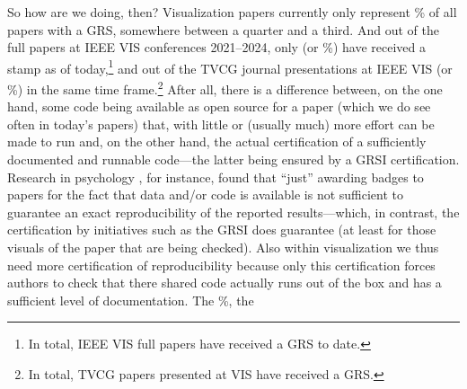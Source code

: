 \documentclass[conference,svgnames]{vgtc}                     %
\newcommand*{\percentageRounded}[2]{%
	\pgfmathparse{#1*100/#2}%
	\pgfmathprintnumber[fixed, precision=1]{\pgfmathresult}%
}
\begin{document}
So how are we doing, then? Visualization papers currently only represent \GrsiPercentageVisPapers{}\% of all papers with a GRS, somewhere between a quarter and a third. And out of the \pgfmathparse{\TotalIeeeVisPapersInMMXXIV+\TotalIeeeVisPapersInMMXXIII+\TotalIeeeVisPapersInMMXXII+\TotalIeeeVisPapersInMMXXI}\pgfmathprintnumber[fixed, precision=0]{\pgfmathresult} full papers at IEEE VIS conferences 2021--2024, only \pgfmathparse{\GrsiIeeeVisPapersInMMXXIV+\GrsiIeeeVisPapersInMMXXIII+\GrsiIeeeVisPapersInMMXXII+\GrsiIeeeVisPapersInMMXXI}\pgfmathprintnumber[fixed, precision=0]{\pgfmathresult} (or \percentageRounded{(\GrsiIeeeVisPapersInMMXXIV+\GrsiIeeeVisPapersInMMXXIII+\GrsiIeeeVisPapersInMMXXII+\GrsiIeeeVisPapersInMMXXI)}{(\TotalIeeeVisPapersInMMXXIV+\TotalIeeeVisPapersInMMXXIII+\TotalIeeeVisPapersInMMXXII+\TotalIeeeVisPapersInMMXXI)}\%) have received a stamp as of today,\footnote{In total, \GrsiIeeeVisPapersCount{} IEEE VIS full papers have received a GRS to date.} and \pgfmathparse{\GrsiIeeeVisTVCGJournalPapersInMMXXIV+\GrsiIeeeVisTVCGJournalPapersInMMXXIII+\GrsiIeeeVisTVCGJournalPapersInMMXXII+\GrsiIeeeVisTVCGJournalPapersInMMXXI}\pgfmathprintnumber[fixed, precision=0]{\pgfmathresult} out of the \pgfmathparse{\TotalIeeeVisTVCGJournalPapersInMMXXIV+\TotalIeeeVisTVCGJournalPapersInMMXXIII+\TotalIeeeVisTVCGJournalPapersInMMXXII+\TotalIeeeVisTVCGJournalPapersInMMXXI}\pgfmathprintnumber[fixed, precision=0]{\pgfmathresult} TVCG journal presentations at IEEE VIS (or \percentageRounded{(\GrsiIeeeVisTVCGJournalPapersInMMXXIV+\GrsiIeeeVisTVCGJournalPapersInMMXXIII+\GrsiIeeeVisTVCGJournalPapersInMMXXII+\GrsiIeeeVisTVCGJournalPapersInMMXXI)}{(\TotalIeeeVisTVCGJournalPapersInMMXXIV+\TotalIeeeVisTVCGJournalPapersInMMXXIII+\TotalIeeeVisTVCGJournalPapersInMMXXII+\TotalIeeeVisTVCGJournalPapersInMMXXI)}\%) in the same time frame.\footnote{In total, \GrsiIeeeVisTvcgJournalPresentationsCount{} TVCG papers presented at VIS have received a GRS.} After all, there is a difference between, on the one hand, some code being available as open source for a paper (which we do see often in today's papers) that, with little or (usually much) more effort \cite{Bonneel:2020:CRC} can be made to run and, on the other hand, the actual certification of a sufficiently documented and runnable code---the latter being ensured by a GRSI certification. Research in psychology \cite{Crumwell:2023:WBC}, for instance, found that ``just'' awarding badges to papers for the fact that data and/or code is available is not sufficient to guarantee an exact reproducibility of the reported results---which, in contrast, the certification by initiatives such as the GRSI does guarantee (at least for those visuals of the paper that are being checked). Also within visualization we thus need more certification of reproducibility because only this certification forces authors to check that there shared code actually runs out of the box and has a sufficient level of documentation. The \GrsiPercentageVisPapers{}\%, the 
\end{document}
